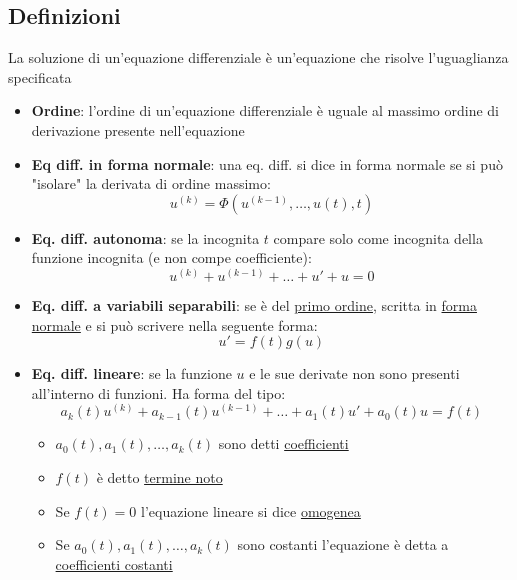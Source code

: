 \subsection{Definizioni}
La soluzione di un'equazione differenziale è un'equazione che risolve l'uguaglianza specificata
\begin{itemize}
	\item \textbf{Ordine}: l'ordine di un'equazione differenziale è uguale al massimo ordine di derivazione presente nell'equazione
	\item \textbf{Eq diff. in forma normale}: una eq. diff. si dice in forma normale se si può "isolare" la derivata di ordine massimo:
	      \[
		      u^{\left( k \right) } = \Phi \left( u^{\left( k-1 \right) },\ldots, u\left( t \right) ,t \right)
	      \]
	\item \textbf{Eq. diff. autonoma}: se la incognita $ t $ compare solo come incognita della funzione incognita (e non compe coefficiente):
	      \[
		      u^{\left( k \right) }+ u ^{\left( k-1 \right) }+\ldots+u' + u =0
	      \]
	\item \textbf{Eq. diff. a variabili separabili}: se è del \underline{primo ordine}, scritta in \underline{forma normale} e si può scrivere nella seguente forma:
	      \[
		      u'= f\left( t \right) g\left( u \right)
	      \]
	\item \textbf{Eq. diff. lineare}: se la funzione $ u $ e le sue derivate non sono presenti all'interno di funzioni. Ha forma del tipo:
	      \[
		      a_k\left( t \right) u^{\left( k \right) }+ a_{k-1}\left( t \right) u^{\left( k-1 \right) }+\ldots+ a_1\left( t \right) u'+ a_0\left( t \right) u = f\left( t \right)
	      \]
	      \begin{itemize}
		      \item $ a_0\left( t \right) , a_1\left( t \right) ,\ldots, a_k\left( t \right)  $ sono detti \underline{coefficienti}
		      \item $ f\left( t \right)  $ è detto \underline{termine noto}
		      \item Se $ f\left( t \right) =0 $ l'equazione lineare si dice \underline{omogenea}
		      \item Se $ a_0\left( t \right) , a_1\left( t \right) ,\ldots, a_k\left( t \right)  $ sono costanti l'equazione è detta a \underline{coefficienti costanti}
	      \end{itemize}
\end{itemize}

